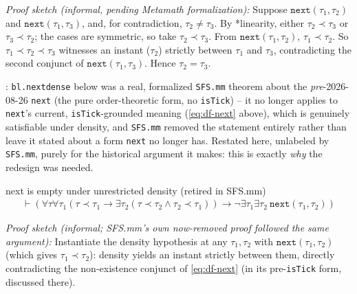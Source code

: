 \noindent\emph{Proof sketch (informal, pending Metamath formalization):} Suppose
$\texttt{next}(\tau_1,\tau_2)$ and $\texttt{next}(\tau_1,\tau_3)$, and, for contradiction,
$\tau_2 \ne \tau_3$.  By *linearity, either $\tau_2 \prec \tau_3$ or $\tau_3 \prec \tau_2$; the cases are
symmetric, so take $\tau_2 \prec \tau_3$.  From $\texttt{next}(\tau_1,\tau_2)$, $\tau_1 \prec \tau_2$.
So $\tau_1 \prec \tau_2 \prec \tau_3$ witnesses an instant ($\tau_2$) strictly between $\tau_1$ and
$\tau_3$, contradicting the second conjunct of $\texttt{next}(\tau_1,\tau_3)$.  Hence $\tau_2 = \tau_3$.

\pn {}: \texttt{bl.nextdense} below was a real, formalized \texttt{SFS.mm}
theorem about the \emph{pre}-2026-08-26 \texttt{next} (the pure order-theoretic form, no \texttt{isTick}) --
it no longer applies to \texttt{next}'s current, \texttt{isTick}-grounded meaning (\eqref{eq:df-next} above),
which is genuinely satisfiable under density, and \texttt{SFS.mm} removed the statement entirely rather than
leave it stated about a form \texttt{next} no longer has. Restated here, unlabeled by \texttt{SFS.mm}, purely
for the historical argument it makes: this is exactly \emph{why} the redesign was needed.

\begin{lemma} {next is empty under unrestricted density (retired in SFS.mm)}
\begin{align}
\vdash ( \forall \tau\forall \tau_1 ( \tau \prec \tau_1 \rightarrow \exists \tau_2 ( \tau \prec \tau_2
    \wedge \tau_2 \prec \tau_1 ) ) \rightarrow \lnot \exists \tau_1\exists \tau_2~\texttt{next}( \tau_1,
    \tau_2 ) )\label{eq:bl.nextdense}\tag{bl.nextdense}
\end{align}
\end{lemma}

\noindent\emph{Proof sketch (informal; SFS.mm's own now-removed proof followed the same argument):}
Instantiate the density hypothesis at any $\tau_1,\tau_2$ with $\texttt{next}(\tau_1,\tau_2)$ (which gives
$\tau_1 \prec \tau_2$): density yields an instant strictly between them, directly contradicting the
non-existence conjunct of \eqref{eq:df-next} (in its pre-\texttt{isTick} form, discussed there).

